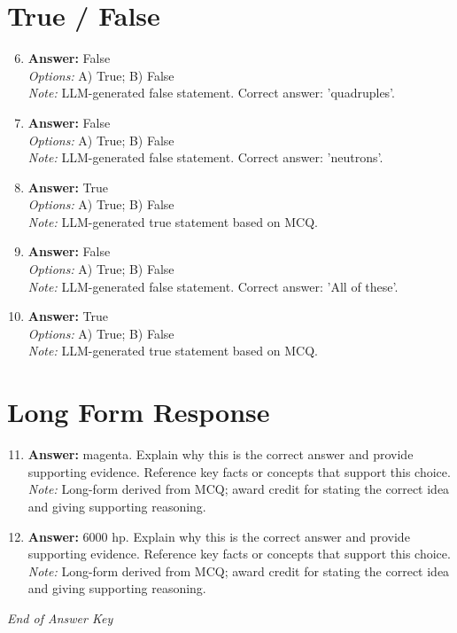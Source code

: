 \documentclass[12pt]{article}
\begin{document}
\section*{True / False}
\begin{enumerate}[label=\arabic*.]
\setcounter{enumi}{5}
\item \textbf{Answer:} False
\\ \textit{Options:} A) True; B) False
\\ \textit{Note:} LLM-generated false statement. Correct answer: 'quadruples'.
\item \textbf{Answer:} False
\\ \textit{Options:} A) True; B) False
\\ \textit{Note:} LLM-generated false statement. Correct answer: 'neutrons'.
\item \textbf{Answer:} True
\\ \textit{Options:} A) True; B) False
\\ \textit{Note:} LLM-generated true statement based on MCQ.
\item \textbf{Answer:} False
\\ \textit{Options:} A) True; B) False
\\ \textit{Note:} LLM-generated false statement. Correct answer: 'All of these'.
\item \textbf{Answer:} True
\\ \textit{Options:} A) True; B) False
\\ \textit{Note:} LLM-generated true statement based on MCQ.
\end{enumerate}

\section*{Long Form Response}
\begin{enumerate}[label=\arabic*.]
\setcounter{enumi}{10}
\item \textbf{Answer:} magenta. Explain why this is the correct answer and provide supporting evidence. Reference key facts or concepts that support this choice.
\\ \textit{Note:} Long-form derived from MCQ; award credit for stating the correct idea and giving supporting reasoning.
\item \textbf{Answer:} 6000 hp. Explain why this is the correct answer and provide supporting evidence. Reference key facts or concepts that support this choice.
\\ \textit{Note:} Long-form derived from MCQ; award credit for stating the correct idea and giving supporting reasoning.
\end{enumerate}

\vfill
\noindent\textit{End of Answer Key}
\end{document}
